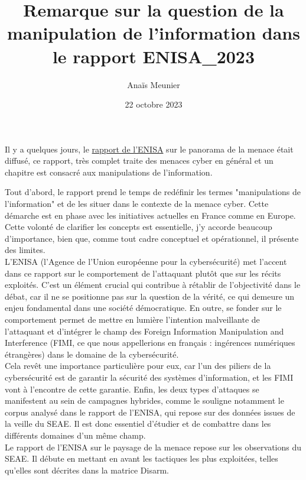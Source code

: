 \documentclass[a4paper]{article}
\title{Remarque sur la question de la manipulation de l'information dans le rapport ENISA_2023}
\author{Anaïs Meunier} %
\date{22 octobre 2023}
\begin{document}
\maketitle                 

Il y a quelques jours, le \href{https://www.enisa.europa.eu/publications/enisa-threat-landscape-2023}{rapport de l'ENISA} sur le panorama de la menace était diffusé, ce rapport, très complet traite des menaces cyber en général et un chapitre est consacré aux manipulations de l'information.

Tout d'abord, le rapport prend le temps de redéfinir les termes "manipulations de l'information" et de les situer dans le contexte de la menace cyber. Cette démarche est en phase avec les initiatives actuelles en France comme en Europe. Cette volonté de clarifier les concepts est essentielle, j'y accorde beaucoup d'importance, bien que, comme tout cadre conceptuel et opérationnel, il présente des limites.
\\

L'ENISA (l'Agence de l'Union européenne pour la cybersécurité) met l'accent dans ce rapport sur le comportement de l'attaquant plutôt que sur les récits exploités. C'est un élément crucial qui contribue à rétablir de l'objectivité dans le débat, car il ne se positionne pas sur la question de la vérité, ce qui demeure un enjeu fondamental dans une société démocratique. En outre, se fonder sur le comportement permet de mettre en lumière l'intention malveillante de l'attaquant et d'intégrer le champ des Foreign Information Manipulation and Interference (FIMI, ce que nous appellerions en français : ingérences numériques étrangères) dans le domaine de la cybersécurité.
\\

Cela revêt une importance particulière pour eux, car l'un des piliers de la cybersécurité est de garantir la sécurité des systèmes d'information, et les FIMI vont à l'encontre de cette garantie. Enfin, les deux types d'attaques se manifestent au sein de campagnes hybrides, comme le souligne notamment le corpus analysé dans le rapport de l'ENISA, qui repose sur des données issues de la veille du SEAE. Il est donc essentiel d'étudier et de combattre dans les différents domaines d'un même champ.
\\

Le rapport de l'ENISA sur le paysage de la menace repose sur les observations du SEAE. Il débute en mettant en avant les tactiques les plus exploitées, telles qu'elles sont décrites dans la matrice Disarm.
\\
\end{document}
